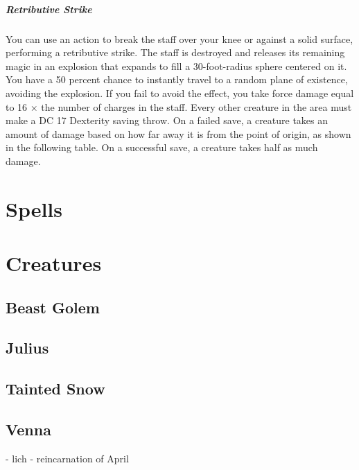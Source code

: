 \documentclass[letter,10pt,twocolumn,openany]{dndbook}
\begin{document}
\paragraph{Retributive Strike}
    You can use an action to break the staff over your knee or against a solid surface, performing a retributive strike. The staff is destroyed and releases its remaining magic in an explosion that expands to fill a 30-foot-radius sphere centered on it.
    You have a 50 percent chance to instantly travel to a random plane of existence, avoiding the explosion. If you fail to avoid the effect, you take force damage equal to 16 × the number of charges in the staff. Every other creature in the area must make a DC 17 Dexterity saving throw. On a failed save, a creature takes an amount of damage based on how far away it is from the point of origin, as shown in the following table. On a successful save, a creature takes half as much damage.





\chapter{Spells}


\chapter{Creatures}

\section{Beast Golem}
\section{Julius}
\section{Tainted Snow}
\section{Venna}
- lich
- reincarnation of April
\end{document}
